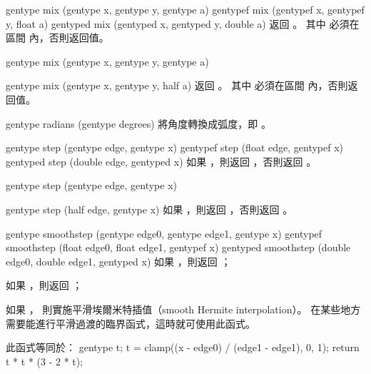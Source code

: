 gentype mix (gentype x,
		gentype y,
		gentype a)
gentypef mix (gentypef x,
		gentypef y,
		float a)
gentyped mix (gentyped x,
		gentyped y,
		double a)
\stopbuffer
{}
返回 。
其中  必須在區間  內，否則返回值。
\stopbuffer

gentype mix (gentype x,
		gentype y,
		gentype a)

gentype mix (gentype x,
		gentype y,
		half a)
\stopbuffer
{}
返回 。
其中  必須在區間  內，否則返回值。
\stopbuffer

gentype radians (gentype degrees)
\stopbuffer
{}
將角度轉換成弧度，即 。
\stopbuffer

gentype step (gentype edge,
		gentype x)
gentypef step (float edge,
		gentypef x)
gentyped step (double edge,
		gentyped x)
\stopbuffer
{}
如果 ，則返回 ，否則返回 。
\stopbuffer

gentype step (gentype edge,
		gentype x)

gentype step (half edge,
		gentype x)
\stopbuffer
{}
如果 ，則返回 ，否則返回 。
\stopbuffer

gentype smoothstep (gentype edge0,
		gentype edge1,
		gentype x)
gentypef smoothstep (float edge0,
		float edge1,
		gentypef x)
gentyped smoothstep (double edge0,
		double edge1,
		gentyped x)
\stopbuffer
{}
如果 ，則返回 ；

如果 ，則返回 ；

如果 ，
則實施平滑埃爾米特插值（smooth Hermite interpolation）。
在某些地方需要能進行平滑過渡的臨界函式，這時就可使用此函式。

此函式等同於：
\startcintbl
gentype t;
t = clamp((x - edge0) / (edge1 - edge1), 0, 1);
return t * t * (3 - 2 * t);
\stopcintbl


